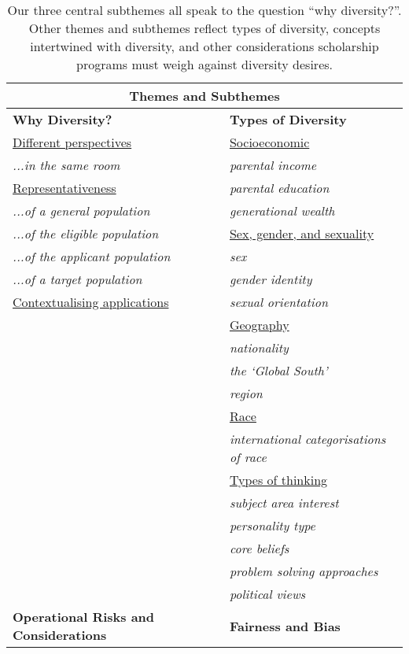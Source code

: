 \begin{table}[htbp]
    \centering
    \caption{Our three central subthemes all speak to the question ``why diversity?''. Other themes and subthemes reflect types of diversity, concepts intertwined with diversity, and other considerations scholarship programs must weigh against diversity desires.}
    \label{tab:themes}
    \begin{tabular}{|p{}|p{}|}
        \hline
        \multicolumn{2}{|c|}{\textbf{Themes and Subthemes}} \\
        \hline
        \textbf{Why Diversity?} & \textbf{Types of Diversity} \\
        \underline{Different perspectives} & \underline{Socioeconomic} \\
        \emph{...in the same room} & \emph{parental income} \\
        \underline{Representativeness} & \emph{parental education} \\
        \emph{...of a general population} & \emph{generational wealth} \\
        \emph{...of the eligible population} & \underline{Sex, gender, and sexuality} \\
        \emph{...of the applicant population} & \emph{sex} \\
        \emph{...of a target population} & \emph{gender identity} \\
        \underline{Contextualising applications} & \emph{sexual orientation} \\
         & \underline{Geography} \\
         & \emph{nationality} \\
         & \emph{the `Global South'} \\
         & \emph{region} \\
         & \underline{Race} \\
         & \emph{international categorisations of race} \\
         & \underline{Types of thinking} \\
         & \emph{subject area interest} \\
         & \emph{personality type} \\
         & \emph{core beliefs} \\
         & \emph{problem solving approaches} \\
         & \emph{political views} \\
        \hline
        \textbf{Operational Risks and Considerations} & \textbf{Fairness and Bias} \\

\end{tabular}
\end{table}

